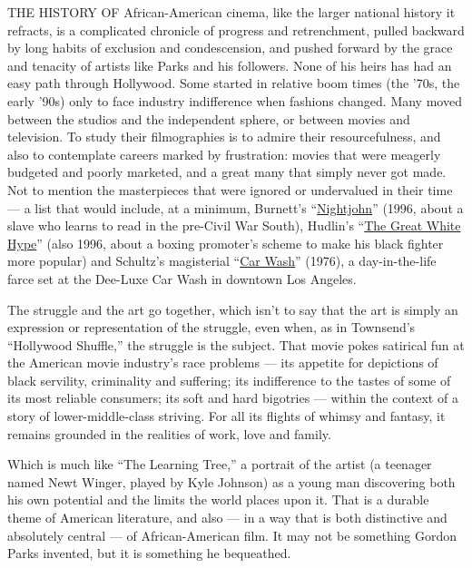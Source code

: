 THE HISTORY OF African-American cinema, like the larger national history
it refracts, is a complicated chronicle of progress and retrenchment,
pulled backward by long habits of exclusion and condescension, and
pushed forward by the grace and tenacity of artists like Parks and his
followers. None of his heirs has had an easy path through Hollywood.
Some started in relative boom times (the '70s, the early '90s) only to
face industry indifference when fashions changed. Many moved between the
studios and the independent sphere, or between movies and television. To
study their filmographies is to admire their resourcefulness, and also
to contemplate careers marked by frustration: movies that were meagerly
budgeted and poorly marketed, and a great many that simply never got
made. Not to mention the masterpieces that were ignored or undervalued
in their time --- a list that would include, at a minimum, Burnett's
``\href{https://www.nytimes3xbfgragh.onion/watching/titles/movies/1000115143}{Nightjohn}''
(1996, about a slave who learns to read in the pre-Civil War South),
Hudlin's
``\href{https://www.nytimes3xbfgragh.onion/watching/titles/movies/1000114177}{The
Great White Hype}'' (also 1996, about a boxing promoter's scheme to make
his black fighter more popular) and Schultz's magisterial
``\href{https://www.nytimes3xbfgragh.onion/watching/titles/movies/1000082349}{Car
Wash}'' (1976), a day-in-the-life farce set at the Dee-Luxe Car Wash in
downtown Los Angeles.

The struggle and the art go together, which isn't to say that the art is
simply an expression or representation of the struggle, even when, as in
Townsend's ``Hollywood Shuffle,'' the struggle is the subject. That
movie pokes satirical fun at the American movie industry's race problems
--- its appetite for depictions of black servility, criminality and
suffering; its indifference to the tastes of some of its most reliable
consumers; its soft and hard bigotries --- within the context of a story
of lower-middle-class striving. For all its flights of whimsy and
fantasy, it remains grounded in the realities of work, love and family.

Which is much like ``The Learning Tree,'' a portrait of the artist (a
teenager named Newt Winger, played by Kyle Johnson) as a young man
discovering both his own potential and the limits the world places upon
it. That is a durable theme of American literature, and also --- in a
way that is both distinctive and absolutely central --- of
African-American film. It may not be something Gordon Parks invented,
but it is something he bequeathed.


